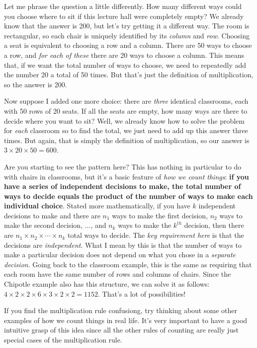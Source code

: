 \documentclass[12pt]{article}
\begin{document}
Let me phrase the question a little differently.
How many different ways could you choose where to sit if this lecture hall were completely empty?
We already know that the answer is 200, but let's try getting it a different way.
The room is rectangular, so each chair is uniquely identified by its \emph{column} and \emph{row}.
Choosing a seat is equivalent to choosing a row and a column.
There are 50 ways to choose a row, and \emph{for each of these} there are 20 ways to choose a column.
This means that, if we want the total number of ways to choose, we need to repeatedly add the number 20 a total of 50 times.
But that's just the definition of multiplication, so the answer is 200.

Now suppose I added one more choice: there are \emph{three} identical classrooms, each with 50 rows of 20 seats.
If all the seats are empty, how many ways are there to decide where you want to sit?
Well, we already know how to solve the problem for \emph{each} classroom so to find the total, we just need to add up this answer three times.
But again, that is simply the definition of multiplication, so our answer is $3 \times 20 \times 50 = 600$.

Are you starting to see the pattern here?
This has nothing in particular to do with chairs in classrooms, but it's a basic feature of \emph{how we count things}: \textbf{if you have a series of independent decisions to make, the total number of ways to decide equals the product of the number of ways to make each individual choice}.
Stated more mathematically, if you have $k$ independent decisions to make and there are $n_1$ ways to make the first decision, $n_2$ ways to make the second decision, $\hdots$, and $n_k$ ways to make the $k^{th}$ decision, then there are $n_1 \times n_2 \times \cdots \times n_k$ total ways to decide.
The \emph{key requirement here} is that the decisions are \emph{independent}.
What I mean by this is that the number of ways to make a particular decision does not depend on what you chose in a \emph{separate decision}.
Going back to the classroom example, this is the same as requiring that each room have the same number of rows and columns of chairs.
Since the Chipotle example also has this structure, we can solve it as follows: $4 \times 2 \times 2 \times 6 \times 3 \times 2 \times 2 = 1152$.
That's a lot of possibilities!

If you find the multiplication rule confusiong, try thinking about some other examples of how we count things in real life.
It's very important to have a good intuitive grasp of this idea since all the other rules of counting are really just special cases of the multiplication rule.
\end{document}
